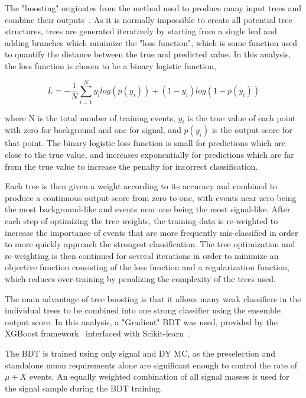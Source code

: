 The "boosting" originates from the method used to produce many input trees and combine their outputs~\cite{GradBoost}. 
As it is normally impossible to create all potential tree structures, trees are generated iteratively by starting from a single leaf and adding branches which minimize the "loss function", which is some function used to quantify the distance between the true and predicted value.
In this analysis, the loss function is chosen to be a binary logistic function,

\begin{equation}
	\label{binLogFunc}
	L = - \frac{1}{N} \sum_{i=1}^{N} y_i log(p(y_i)) + (1-y_i) log(1-p(y_i))
\end{equation} 

where N is the total number of training events, $y_i$ is the true value of each point with zero for background and one for signal, and $p(y_i)$ is the output score for that point.
The binary logistic loss function is small for predictions which are close to the true value, and increases exponentially for predictions which are far from the true value to increase the penalty for incorrect classification.

Each tree is then given a weight according to its accuracy and combined to produce a continuous output score from zero to one, with events near zero being the most background-like and events near one being the most signal-like. 
After each step of optimizing the tree weights, the training data is re-weighted to increase the importance of events that are more frequently mis-classified in order to more quickly approach the strongest classification.
The tree optimization and re-weighting is then continued for several iterations in order to minimize an objective function consisting of the loss function and a regularization function, which reduces over-training by penalizing the complexity of the trees used.

The main advantage of tree boosting is that it allows many weak classifiers in the individual trees to be combined into one strong classifier using the ensemble output score.
In this analysis, a "Gradient" BDT was used, provided by the XGBoost framework~\cite{XGBoost} interfaced with Scikit-learn~\cite{scikit}. 

The BDT is trained using only signal and DY MC, as the preselection and standalone muon requirements alone are significant enough to control the rate of $\mu+X$ events. 
An equally weighted combination of all signal masses is used for the signal sample during the BDT training.

